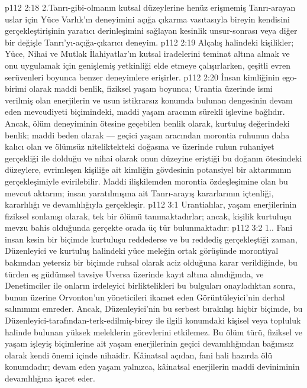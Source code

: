 \vs p112 2:18 2.\bibnobreakspace Tanrı\hyp{}gibi\hyp{}olmanın kutsal düzeylerine henüz erişmemiş Tanrı\hyp{}arayan uslar için Yüce Varlık’ın deneyimini açığa çıkarma vasıtasıyla bireyin kendisini gerçekleştirişinin yaratıcı derinleşimini sağlayan kesinlik unsur\hyp{}sonrası veya diğer bir değişle Tanrı’yı\hyp{}açığa\hyp{}çıkarıcı deneyim.
\vs p112 2:19 Alçalış halindeki kişilikler; Yüce, Nihai ve Mutlak İlahiyatlar’ın kutsal iradelerini teminat altına almak ve onu uygulamak için genişlemiş yetkinliği elde etmeye çalışırlarken, çeşitli evren serüvenleri boyunca benzer deneyimlere erişirler.
\vs p112 2:20 İnsan kimliğinin ego\hyp{}birimi olarak maddi benlik, fiziksel yaşam boyunca; Urantia üzerinde  ismi verilmiş olan enerjilerin ve usun istikrarsız konumda bulunan dengesinin devam eden mevcudiyeti biçimindeki, maddi yaşam aracının sürekli işlevine bağlıdır. Ancak, ölüm deneyiminin ötesine geçebilen benlik olarak, kurtuluş değerindeki benlik; maddi beden olarak --- geçici yaşam aracından morontia ruhunun daha kalıcı olan ve ölümsüz niteliktekteki doğasına ve üzerinde ruhun ruhaniyet gerçekliği ile dolduğu ve nihai olarak onun düzeyine eriştiği bu doğanın ötesindeki düzeylere, evrimleşen kişiliğe ait kimliğin gövdesinin potansiyel bir aktarımının gerçekleşimiyle evirilebilir. Maddi ilişkilemden morontia özdeşleşimine olan bu mevcut aktarım; insan yaratılmışına ait Tanrı\hyp{}arayış kararlarının içtenliği, kararlılığı ve devamlılığıyla gerçekleşir.
\vs p112 3:1 Urantialılar, yaşam enerjilerinin fiziksel sonlanışı olarak, tek bir ölümü tanımaktadırlar; ancak, kişilik kurtuluşu mevzu bahis olduğunda gerçekte orada üç tür bulunmaktadır:
\vs p112 3:2 1.. Fani insan kesin bir biçimde kurtuluşu reddederse ve bu reddediş gerçekleştiği zaman, Düzenleyici ve kurtuluş halindeki yüce meleğin ortak görüşünde morontiyal bakımdan yetersiz bir biçimde ruhsal olarak aciz olduğuna karar verildiğinde, bu türden eş güdümsel tavsiye Uversa üzerinde kayıt altına alındığında, ve Denetimciler ile onların irdeleyici birliktelikleri bu bulguları onayladıktan sonra, bunun üzerine Orvonton’un yöneticileri ikamet eden Görüntüleyici’nin derhal salınımını emreder. Ancak, Düzenleyici’nin bu serbest bırakılışı hiçbir biçimde, bu Düzenleyici\hyp{}tarafından\hyp{}terk\hyp{}edilmiş\hyp{}birey ile ilgili konumdaki kişisel veya topluluk halinde bulunan yüksek meleklerin görevlerini etkilemez. Bu ölüm türü, fiziksel ve yaşam işleyiş biçimlerine ait yaşam enerjilerinin geçici devamlılığından bağımsız olarak kendi önemi içinde nihaidir. Kâinatsal açıdan, fani hali hazırda ölü konumdadır; devam eden yaşam yalnızca, kâinatsal enerjilerin maddi deviniminin devamlılığına işaret eder.
